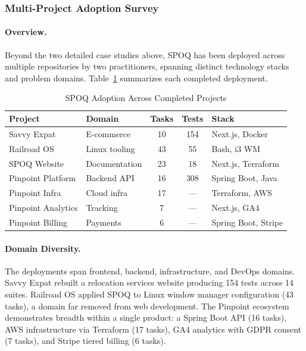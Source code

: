 \subsubsection{Multi-Project Adoption Survey}
\label{subsec:adoption-survey}

\paragraph{Overview.}
Beyond the two detailed case studies above, SPOQ has been deployed across
multiple repositories by two practitioners, spanning distinct technology
stacks and problem domains. Table~\ref{tab:adoption} summarizes each
completed deployment.

\begin{table}[htbp]
\centering
\caption{SPOQ Adoption Across Completed Projects}
\label{tab:adoption}
\small
\begin{tabular}{llccl}
\toprule
\textbf{Project} & \textbf{Domain} & \textbf{Tasks} & \textbf{Tests} & \textbf{Stack} \\
\midrule
Savvy Expat & E-commerce & 10 & 154 & Next.js, Docker \\
Railroad OS & Linux tooling & 43 & 55 & Bash, i3 WM \\
SPOQ Website & Documentation & 23 & 18 & Next.js, Terraform \\
Pinpoint Platform & Backend API & 16 & 308 & Spring Boot, Java \\
Pinpoint Infra & Cloud infra & 17 & --- & Terraform, AWS \\
Pinpoint Analytics & Tracking & 7 & --- & Next.js, GA4 \\
Pinpoint Billing & Payments & 6 & --- & Spring Boot, Stripe \\
\bottomrule
\end{tabular}
\end{table}

\paragraph{Domain Diversity.}
The deployments span frontend, backend, infrastructure, and DevOps domains.
Savvy Expat rebuilt a relocation services website producing 154 tests across
14 suites. Railroad OS applied SPOQ to Linux window manager configuration
(43 tasks), a domain far removed from web development. The Pinpoint ecosystem
demonstrates breadth within a single product: a Spring Boot API (16 tasks),
AWS infrastructure via Terraform (17 tasks), GA4 analytics with GDPR consent
(7 tasks), and Stripe tiered billing (6 tasks).

